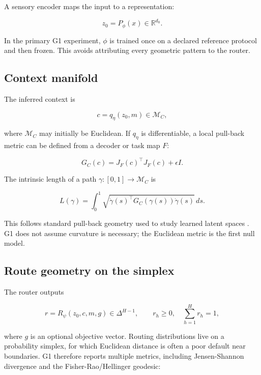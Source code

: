 \documentclass[11pt,a4paper]{article}
\newcommand{\simplex}{\Delta^{H-1}}
\newcommand{\R}{\mathbb{R}}
\begin{document}
A sensory encoder maps the input to a representation:

\begin{equation}
 z_0=P_\phi(x)\in\R^{d_0}.
\end{equation}

In the primary G1 experiment, \(\phi\) is trained once on a declared reference protocol and then frozen. This avoids attributing every geometric pattern to the router.

\subsection{Context manifold}

The inferred context is

\begin{equation}
 c=q_\eta(z_0,m)\in\mathcal{M}_C,
\end{equation}

where \(\mathcal{M}_C\) may initially be Euclidean. If \(q_\eta\) is differentiable, a local pull-back metric can be defined from a decoder or task map \(F\):

\begin{equation}
 G_C(c)=J_F(c)^\top J_F(c)+\epsilon I.
\end{equation}

The intrinsic length of a path \(\gamma:[0,1]\rightarrow\mathcal{M}_C\) is

\begin{equation}
 L(\gamma)=\int_0^1 \sqrt{\dot\gamma(s)^\top G_C(\gamma(s))\dot\gamma(s)}\,ds.
\end{equation}

This follows standard pull-back geometry used to study learned latent spaces \citep{arvanitidis2018latent,shao2018riemannian}. G1 does not assume curvature is necessary; the Euclidean metric is the first null model.

\subsection{Route geometry on the simplex}

The router outputs

\begin{equation}
 r=R_\psi(z_0,c,m,g)\in\simplex,
 \qquad r_h\ge0,\quad \sum_{h=1}^H r_h=1,
\end{equation}

where \(g\) is an optional objective vector. Routing distributions live on a probability simplex, for which Euclidean distance is often a poor default near boundaries. G1 therefore reports multiple metrics, including Jensen-Shannon divergence and the Fisher-Rao/Hellinger geodesic:
\end{document}

